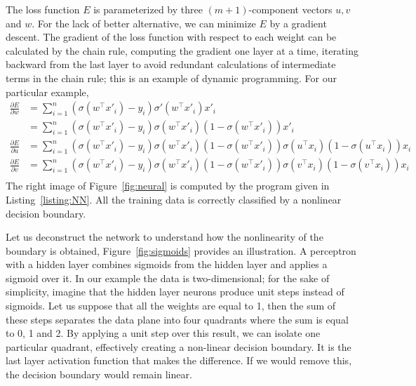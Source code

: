\documentclass[notitlepage,oneside]{book}
\begin{document}
The loss function $E$ is parameterized by three $(m+1)$-component vectors $u, v$ and $w$.
For the lack of better alternative, we can minimize $E$ by a gradient descent.
The gradient of the loss function with respect to each weight can be calculated by the chain rule, computing the gradient one layer at a time,
iterating backward from the last layer to avoid redundant calculations of intermediate terms in the chain rule; this is an example of dynamic programming.
For our particular example, 
\begin{align*}
\frac{\partial E}{\partial w} & =  \sum_{i=1}^{n} \left(\sigma\left(w^\top x'_i\right)  - y_i\right) \sigma'\left(w^\top x'_i\right)  x'_i \\
                              & =  \sum_{i=1}^{n} \left(\sigma\left(w^\top x'_i\right)  - y_i\right) \sigma\left(w^\top x'_i\right) (1-\sigma\left(w^\top x'_i\right) ) x'_i \\
\frac{\partial E}{\partial u} & =  \sum_{i=1}^{n} \left(\sigma\left(w^\top x'_i\right)  - y_i\right) \sigma\left(w^\top x'_i\right) (1-\sigma\left(w^\top x'_i\right) ) \sigma\left(u^\top x_i\right) (1-\sigma\left(u^\top x_i\right) ) x_i \\
\frac{\partial E}{\partial v} & =  \sum_{i=1}^{n} \left(\sigma\left(w^\top x'_i\right)  - y_i\right) \sigma\left(w^\top x'_i\right) (1-\sigma\left(w^\top x'_i\right) ) \sigma\left(v^\top x_i\right) (1-\sigma\left(v^\top x_i\right) ) x_i \\
\end{align*}
The right image of Figure~\ref{fig:neural} is computed by the program given in Listing~\ref{listing:NN}.
All the training data is correctly classified by a nonlinear decision boundary.

Let us deconstruct the network to understand how the nonlinearity of the boundary is obtained, Figure~\ref{fig:sigmoids} provides an illustration.
A perceptron with a hidden layer combines sigmoids from the hidden layer and applies a sigmoid over it.
In our example the data is two-dimensional; for the sake of simplicity, imagine that the hidden layer neurons produce unit steps instead of sigmoids.
Let us suppose that all the weights are equal to 1, then the sum of these steps separates the data plane into four quadrants where the sum is equal to 0, 1 and 2.
By applying a unit step over this result, we can isolate one particular quadrant, effectively creating a non-linear decision boundary.
It is the last layer activation function that makes the difference.
If we would remove this, the decision boundary would remain linear.
\end{document}

